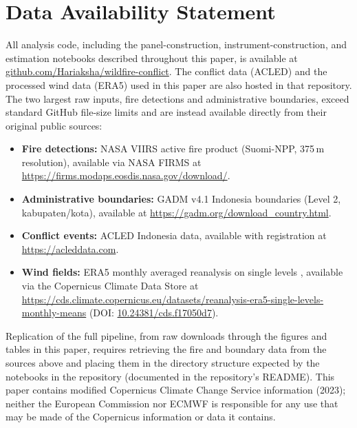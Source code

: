 \documentclass[12pt]{article}
\begin{document}
\section*{Data Availability Statement}

All analysis code, including the panel-construction, instrument-construction, and estimation notebooks described throughout this paper, is available at \href{https://github.com/Hariaksha/wildfire-conflict}{github.com/Hariaksha/wildfire-conflict}. The conflict data (ACLED) and the processed wind data (ERA5) used in this paper are also hosted in that repository. The two largest raw inputs, fire detections and administrative boundaries, exceed standard GitHub file-size limits and are instead available directly from their original public sources:
\begin{itemize}
    \item \textbf{Fire detections:} NASA VIIRS active fire product (Suomi-NPP, 375\,m resolution), available via NASA FIRMS at \url{https://firms.modaps.eosdis.nasa.gov/download/}.
    \item \textbf{Administrative boundaries:} GADM v4.1 Indonesia boundaries (Level 2, kabupaten/kota), available at \url{https://gadm.org/download_country.html}.
    \item \textbf{Conflict events:} ACLED Indonesia data, available with registration at \url{https://acleddata.com}.
    \item \textbf{Wind fields:} ERA5 monthly averaged reanalysis on single levels \citep{hersbach2023era5}, available via the Copernicus Climate Data Store at \url{https://cds.climate.copernicus.eu/datasets/reanalysis-era5-single-levels-monthly-means} (DOI: \href{https://doi.org/10.24381/cds.f17050d7}{10.24381/cds.f17050d7}).
\end{itemize}
Replication of the full pipeline, from raw downloads through the figures and tables in this paper, requires retrieving the fire and boundary data from the sources above and placing them in the directory structure expected by the notebooks in the repository (documented in the repository's README). This paper contains modified Copernicus Climate Change Service information (2023); neither the European Commission nor ECMWF is responsible for any use that may be made of the Copernicus information or data it contains.

\clearpage
\appendix
\renewcommand{\thetable}{A\arabic{table}}
\setcounter{table}{0}
\renewcommand{\thefigure}{A\arabic{figure}}
\setcounter{figure}{0}
\end{document}
